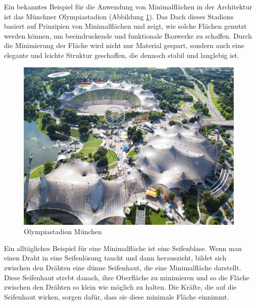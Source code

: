Ein bekanntes Beispiel für die Anwendung von Minimalflächen in der Architektur ist das Münchner Olympiastadion (Abbildung \ref{fig:stadion-1}).
Das Dach dieses Stadions basiert auf Prinzipien von Minimalflächen und zeigt, wie solche Flächen genutzt werden können, um beeindruckende und funktionale Bauwerke zu schaffen.
Durch die Minimierung der Fläche wird nicht nur Material gespart, sondern auch eine elegante und leichte Struktur geschaffen, die dennoch stabil und langlebig ist.
\begin{figure}
	\centering
	\includegraphics[width=\textwidth]{"papers/minimalflaechen/Stadion 1"}
	\caption{Olympiastadion München \cite{minimalflaechen:Olympiastadion}}
	\label{fig:stadion-1}
\end{figure}


Ein alltägliches Beispiel für eine Minimalfläche ist eine Seifenblase.
Wenn man einen Draht in eine Seifenlösung taucht und dann herauszieht, bildet sich zwischen den Drähten eine dünne Seifenhaut, die eine Minimalfläche darstellt.
Diese Seifenhaut strebt danach, ihre Oberfläche zu minimieren und so die Fläche zwischen den Drähten so klein wie möglich zu halten.
Die Kräfte, die auf die Seifenhaut wirken, sorgen dafür, dass sie diese minimale Fläche einnimmt.

